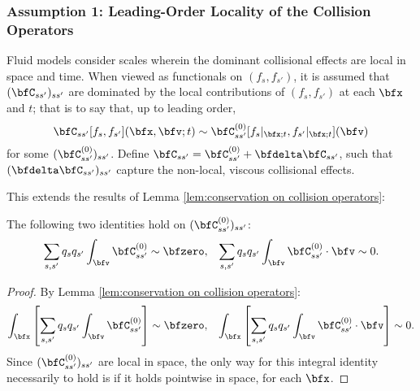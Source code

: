 \subsubsection*{Assumption 1: Leading-Order Locality of the Collision Operators}
    Fluid models consider scales wherein the dominant collisional effects are local in space and time.  When viewed as functionals on $(f_{s}, f_{s'})$, it is assumed that $(\bfC_{ss'})_{ss'}$ are dominated by the local contributions of $(f_{s}, f_{s'})$ at each $\bfx$ and $t$;  that is to say that, up to leading order,
    \begin{equation}\label{eqn:local collision operator}
        \bfC_{ss'}[f_{s}, f_{s'}](\bfx, \bfv; t)  \sim  \bfC_{ss'}^{(0)}[f_{s}|_{\bfx; t}, f_{s'}|_{\bfx; t}](\bfv)
    \end{equation}
    for some $(\bfC_{ss'}^{(0)})_{ss'}$. Define $\bfC_{ss'}  = 
     \bfC_{ss'}^{(0)} + \bfdelta\bfC_{ss'}$, such that $(\bfdelta\bfC_{ss'})_{ss'}$ capture the non-local, viscous collisional effects.
    
    This extends the results of Lemma \ref{lem:conservation on collision operators}:

    \begin{lemma}\label{lem:conservation on local collision operators}
        The following two identities hold on $(\bfC_{ss'}^{(0)})_{ss'}$:
        \begin{align}
            \sum_{s, s'}q_{s}q_{s'}\int_{\bfv}\bfC_{ss'}^{(0)}           \sim  \bfzero,  &&
            \sum_{s, s'}q_{s}q_{s'}\int_{\bfv}\bfC_{ss'}^{(0)}\cdot\bfv  \sim  0.
        \end{align}
    \end{lemma}
    \begin{proof}
        By Lemma \ref{lem:conservation on collision operators}:
        \begin{align}
            \int_{\bfx}\left[\sum_{s, s'}q_{s}q_{s'}\int_{\bfv}\bfC_{ss'}^{(0)}\right]           \sim  \bfzero,  &&
            \int_{\bfx}\left[\sum_{s, s'}q_{s}q_{s'}\int_{\bfv}\bfC_{ss'}^{(0)}\cdot\bfv\right]  \sim  0.
        \end{align}
        Since $(\bfC_{ss'}^{(0)})_{ss'}$ are local in space, the only way for this integral identity necessarily to hold is if it holds pointwise in space, for each $\bfx$.
    \end{proof}